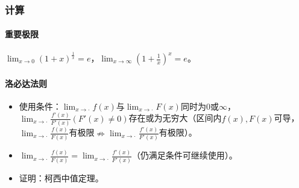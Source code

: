\documentclass[
12pt, %
a4paper, 
oneside, %
headinclude,footinclude, %
]{scrartcl}
\begin{document}
\subsubsection[计算]{计算}
\paragraph{重要极限}
$ \lim_{x \to 0} (1 + x)^{\frac{1}{x}} = e $，$ \lim_{x \to \infty} (1 + \frac{1}{x})^{x} = e $。
\paragraph{洛必达法则}
\begin{itemize}
\item 使用条件：$ \lim_{x \to \cdot} f(x) $与$ \lim_{x \to \cdot} F(x) $同时为$ 0 $或$ \infty $，$ \lim_{x \to \cdot} \frac{f'(x)}{F'(x)}(F'(x) \neq 0) $存在或为无穷大（区间内$ f(x), F(x) $可导，$ \lim_{x \to \cdot} \frac{f(x)}{F(x)} $有极限$ \nRightarrow $$ \lim_{x \to \cdot} \frac{f'(x)}{F'(x)} $有极限）。
\item $ \lim_{x \to \cdot} \frac{f(x)}{F(x)} = \lim_{x \to \cdot} \frac{f'(x)}{F'(x)} $（仍满足条件可继续使用）。
\item 证明：柯西中值定理。
\end{itemize}
\end{document}
